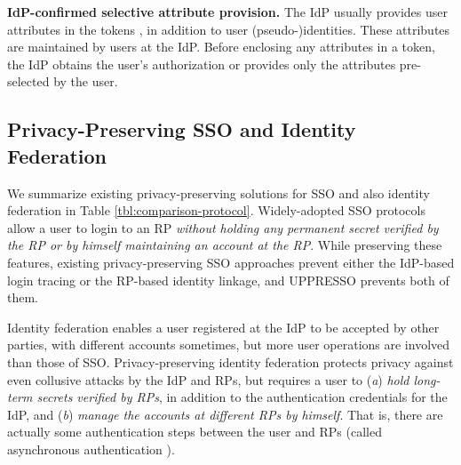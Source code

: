 \noindent\textbf{IdP-confirmed selective attribute provision.}
The IdP usually provides user attributes in the tokens \cite{OpenIDConnect,rfc6749,SAML}, in addition to user (pseudo-)identities.
These attributes are maintained by users at the IdP.
Before enclosing any attributes in a token, the IdP obtains the user's authorization or provides only the attributes pre-selected by the user.

%



\subsection{Privacy-Preserving SSO and Identity Federation}
\label{subsec-solutions}

We summarize existing privacy-preserving solutions for SSO and also identity federation in Table \ref{tbl:comparison-protocol}.
Widely-adopted SSO protocols \cite{OpenIDConnect,rfc6749,SAML,SAMLIdentifier} allow a user to login to an RP
\emph{without holding any permanent secret verified by the RP or by himself maintaining an account at the RP}.
While preserving these features, existing privacy-preserving SSO approaches \cite{BrowserID,SPRESSO,NIST2017draft} prevent either the IdP-based login tracing or the RP-based identity linkage, and UPPRESSO prevents both of them.

Identity federation enables a user registered at the IdP to be accepted by other parties,
            with different accounts sometimes,
        but more user operations are involved than those of SSO.
Privacy-preserving identity federation 
    protects privacy against even collusive attacks by the IdP and RPs,
    but requires a user \cite{ELPASSO,UnlimitID,hyperledge-idemix,PseudoID,Opaak,uprov} to (\emph{a}) \emph{hold long-term secrets verified by RPs},
            in addition to the authentication credentials for the IdP,
                and (\emph{b}) \emph{manage the accounts at different RPs by himself}.
That is, there are actually some authentication steps between the user and RPs (called asynchronous authentication \cite{ELPASSO}).

